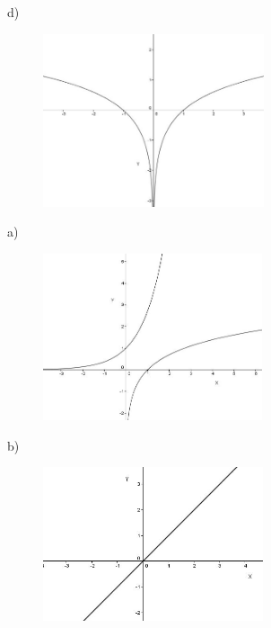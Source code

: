 \begin{respostas}{7}
\begin{multicols}{2}
d)\begin{figure}[H]
	\begin{Center}
		\includegraphics[width=2.56in,height=2.0in]{capitulos/logaritmos_e_funcao_logaritmica/media/image22.jpeg}
	\end{Center}
\end{figure}

    \ansitem{}

a)\begin{figure}[H]
    \begin{Center}
        \includegraphics[width=2.54in,height=1.93in]{capitulos/logaritmos_e_funcao_logaritmica/media/image23.JPG}
    \end{Center}
\end{figure}

b)\begin{figure}[H]
    \begin{Center}
        \includegraphics[width=2.55in,height=1.78in]{capitulos/logaritmos_e_funcao_logaritmica/media/image24.JPG}
    \end{Center}
\end{figure}


\end{multicols}
\end{respostas}

